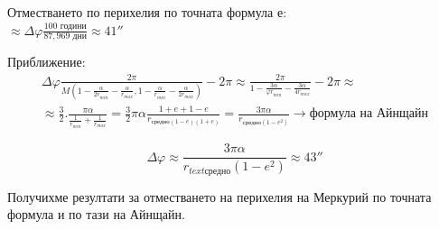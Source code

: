 \documentclass[a4paper,12pt]{article}
\begin{document}
    Отместването по перихелия по точната формула е: \\ 
    $\approx \varDelta\varphi \frac{100\text{ години}}{87, 969 \text{ дни}} \approx 41''$

    Приближение: 
    \begin{equation*}
        \begin{aligned}
            \varDelta\varphi \frac{2\pi}{M\left( 1-\frac{\alpha}{2r_{min}} - \frac{\alpha}{r_{max}}, 1-\frac{\alpha}{r_{min}} - \frac{\alpha}{2r_{max}} \right)} - 2\pi \approx 
            \frac{2\pi}{1 - \frac{3\alpha}{\varphi r_{min}} - \frac{3\alpha}{4r_{max}}} - 2\pi \approx \\
            \approx \frac{3}{2}.\frac{\pi\alpha}{\frac{1}{r_{min}} + \frac{1}{r_{max}}} = \frac{3}{2}\pi\alpha \frac{1+e+1-e}{r_{\text{средно}(1-e)(1+e)}} = \frac{3\pi\alpha}{r_{\text{средно}(1-e^2)}} \rightarrow \text{формула на Айнщайн}
        \end{aligned}
    \end{equation*}

    \begin{equation*}
        \varDelta\varphi \approx \frac{3\pi\alpha}{r_{text{средно}}(1-e^2)} \approx 43''
    \end{equation*}

    Получихме резултати за отместването на перихелия на Меркурий по точната формула и по тази на Айнщайн.
\end{document}
